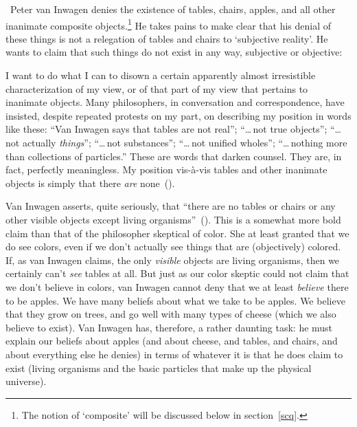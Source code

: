 \documentclass[11pt]{standalone}
\newenvironment{squote}{%
	\begin{spacing}{1}
	\begin{list}{}{%
	\setlength{\labelwidth}{0pt}%
	\rightmargin\leftmargin%
	}
	\item\relax
	}{%
	\end{list}%
	\end{spacing}
	}
\begin{document}
\begin{spacing}{1.5}
\ Peter van Inwagen denies the existence of tables, chairs, apples,
and all other inanimate composite objects.\footnote{The notion of
  `composite' will be discussed below in section~\ref{scq}.}  He takes
pains to make clear that his denial of these things is not a
relegation of tables and chairs to `subjective reality'.  He wants to
claim that such things do not exist in any way, subjective or
objective:
\begin{squote}
I want to do what I can to disown a certain apparently almost
irresistible characterization of my view, or of that part of my view
that pertains to inanimate objects.  Many philosophers, in
conversation and correspondence, have insisted, despite repeated
protests on my part, on describing my position in words like these:
``Van Inwagen says that tables are not real''; ``\ldots\,not true
objects''; ``\ldots\,not actually {\em things}''; ``\ldots\,not
substances''; ``\ldots\,not unified wholes''; ``\ldots\,nothing more
than collections of particles.''  These are words that darken counsel.
They are, in fact, perfectly meaningless.  My position vis-\`{a}-vis
tables and other inanimate objects is simply that there {\em are}
none~(\citeyear[99]{inwagen1995}).
\end{squote}
Van Inwagen asserts, quite seriously, that ``there are no tables or
chairs or any other visible objects except living
organisms''~(\citeyear[1]{inwagen1995}).  This is a somewhat more bold
claim than that of the philosopher skeptical of color.  She at least
granted that we do see colors, even if we don't actually see things
that are (objectively) colored.  If, as van Inwagen claims, the only
{\em visible} objects are living organisms, then we certainly can't
{\em see} tables at all.  But just as our color skeptic could not
claim that we don't believe in colors, van Inwagen cannot deny that we
at least {\em believe} there to be apples.  We have many beliefs about
what we take to be apples.  We believe that they grow on trees, and go
well with many types of cheese (which we also believe to exist).  Van
Inwagen has, therefore, a rather daunting task: he must explain our
beliefs about apples (and about cheese, and tables, and chairs, and
about everything else he denies) in terms of whatever it is that he
does claim to exist (living organisms and the basic particles that
make up the physical universe).


\end{spacing}
\end{document}
